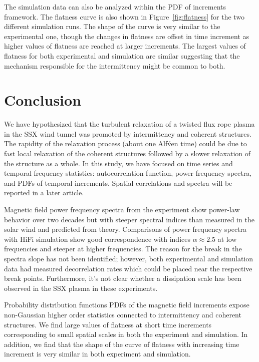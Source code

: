 \documentclass[12pt]{iopart}
\begin{document}
The simulation data can also be analyzed within the PDF of increments framework. The flatness curve is also shown in Figure~\ref{fig:flatness} for the two different simulation runs. The shape of the curve is very similar to the experimental one, though the changes in flatness are offset in time increment as higher values of flatness are reached at larger increments. The largest values of flatness for both experimental and simulation are similar suggesting that the mechanism responsible for the intermittency might be common to both.

\section{Conclusion}

We have hypothesized that the turbulent relaxation of a twisted flux rope plasma in the SSX wind tunnel was promoted by intermittency and coherent structures.  The rapidity of the relaxation process (about one Alf\'ven time) could be due to fast local relaxation of the coherent structures followed by a slower relaxation of the structure as a whole.  In this study, we have focused on time series and temporal frequency statistics: autocorrelation function, power frequency spectra, and PDFs of temporal increments.  Spatial correlations and spectra will be reported in a later article.

Magnetic field power frequency spectra from the experiment show power-law behavior over two decades but with steeper spectral indices than measured in the solar wind and predicted from theory. Comparisons of power frequency spectra with HiFi simulation show good correspondence with indices $\alpha \approx 2.5$ at low frequencies and steeper at higher frequencies.  The reason for the break in the spectra slope has not been identified; however, both experimental and simulation data had measured decorrelation rates which could be placed near the respective break points. Furthermore, it's not clear whether a dissipation scale has been observed in the SSX plasma in these experiments.

Probability distribution functions PDFs of the magnetic field increments expose non-Gaussian higher order statistics connected to intermittency and coherent structures.  We find large values of flatness at short time increments corresponding to small spatial scales in both the experiment and simulation.  In addition, we find that the shape of the curve of flatness with increasing time increment is very similar in both experiment and simulation.
\end{document}
